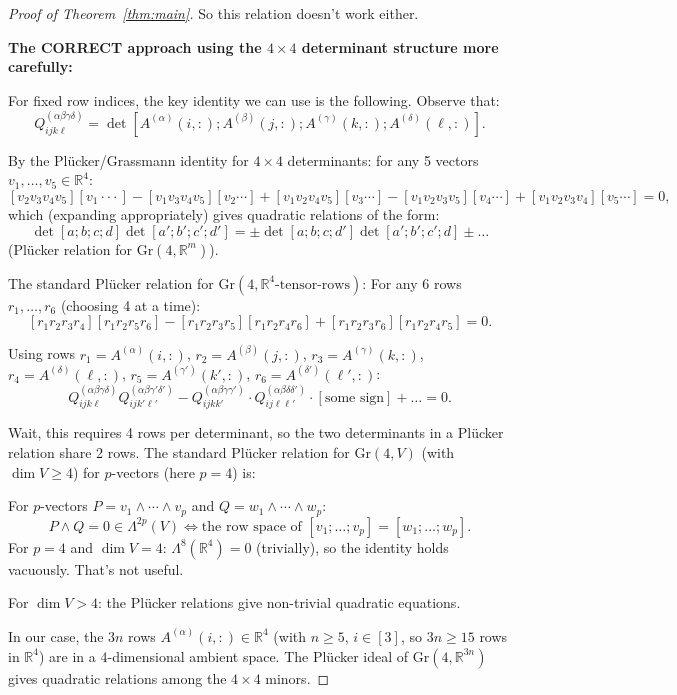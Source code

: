 \documentclass[12pt]{article}
\theoremstyle{definition}
\begin{document}
\begin{proof}[Proof of Theorem~\ref{thm:main}]
So this relation doesn't work either.

\textbf{The CORRECT approach using the $4\times 4$ determinant structure more carefully:}

For fixed row indices, the key identity we can use is the following. Observe that:
$$Q^{(\alpha\beta\gamma\delta)}_{ijk\ell} = \det[A^{(\alpha)}(i,:);A^{(\beta)}(j,:);A^{(\gamma)}(k,:);A^{(\delta)}(\ell,:)].$$

By the Plücker/Grassmann identity for $4\times 4$ determinants: for any 5 vectors $v_1,\ldots,v_5\in\mathbb{R}^4$:
$$[v_2v_3v_4v_5][v_1\cdot\cdot\cdot] - [v_1v_3v_4v_5][v_2\cdots] + [v_1v_2v_4v_5][v_3\cdots] - [v_1v_2v_3v_5][v_4\cdots] + [v_1v_2v_3v_4][v_5\cdots] = 0,$$
which (expanding appropriately) gives quadratic relations of the form:
$$\det[a;b;c;d]\det[a';b';c';d'] = \pm\det[a;b;c;d']\det[a';b';c';d] \pm \ldots$$
(Plücker relation for $\mathrm{Gr}(4,\mathbb{R}^m)$).

The standard Plücker relation for $\mathrm{Gr}(4,\mathbb{R}^4\text{-tensor-rows})$: For any 6 rows $r_1,\ldots,r_6$ (choosing 4 at a time):
$$[r_1r_2r_3r_4][r_1r_2r_5r_6] - [r_1r_2r_3r_5][r_1r_2r_4r_6]+[r_1r_2r_3r_6][r_1r_2r_4r_5] = 0.$$

Using rows $r_1 = A^{(\alpha)}(i,:)$, $r_2 = A^{(\beta)}(j,:)$, $r_3 = A^{(\gamma)}(k,:)$, $r_4 = A^{(\delta)}(\ell,:)$, $r_5 = A^{(\gamma')}(k',:)$, $r_6 = A^{(\delta')}(\ell',:)$:
$$Q^{(\alpha\beta\gamma\delta)}_{ijk\ell}Q^{(\alpha\beta\gamma'\delta')}_{ijk'\ell'} - Q^{(\alpha\beta\gamma\gamma')}_{ijkk'}\cdot Q^{(\alpha\beta\delta\delta')}_{ij\ell\ell'}\cdot[\text{some sign}] + \ldots = 0.$$

Wait, this requires 4 rows per determinant, so the two determinants in a Plücker relation share 2 rows. The standard Plücker relation for $\mathrm{Gr}(4,V)$ (with $\dim V \geq 4$) for $p$-vectors (here $p=4$) is:

For $p$-vectors $P = v_1\wedge\cdots\wedge v_p$ and $Q = w_1\wedge\cdots\wedge w_p$:
$$P\wedge Q = 0 \in \Lambda^{2p}(V) \iff \text{the row space of }[v_1;\ldots;v_p] = [w_1;\ldots;w_p].$$
For $p = 4$ and $\dim V = 4$: $\Lambda^8(\mathbb{R}^4) = 0$ (trivially), so the identity holds vacuously. That's not useful.

For $\dim V > 4$: the Plücker relations give non-trivial quadratic equations.

In our case, the $3n$ rows $A^{(\alpha)}(i,:)\in\mathbb{R}^4$ (with $n\geq 5$, $i\in[3]$, so $3n\geq 15$ rows in $\mathbb{R}^4$) are in a $4$-dimensional ambient space. The Plücker ideal of $\mathrm{Gr}(4,\mathbb{R}^{3n})$ gives quadratic relations among the $4\times 4$ minors.


\end{proof}
\end{document}
